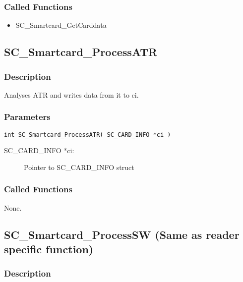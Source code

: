 \documentclass[a4paper,oneside]{article}
\begin{document}
\subsubsection*{Called Functions}

\begin{itemize}
\item SC\_Smartcard\_GetCarddata
\end{itemize}


\subsection{SC\_Smartcard\_ProcessATR}

\subsubsection*{Description}

Analyses ATR and writes data from it to ci.

\subsubsection*{Parameters}

\begin{verbatim}
int SC_Smartcard_ProcessATR( SC_CARD_INFO *ci )
\end{verbatim}

\begin{description}
\item[SC\_CARD\_INFO *ci:] Pointer to SC\_CARD\_INFO struct
\end{description}

\subsubsection*{Called Functions}

None.


\subsection{SC\_Smartcard\_ProcessSW (Same as reader specific function)}

\subsubsection*{Description}
\end{document}
